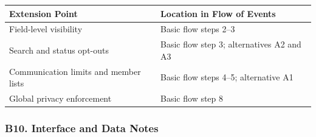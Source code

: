 \documentclass[12pt]{article}
\renewcommand{\baselinestretch}{1.5}
\begin{document}
\begingroup
\small
\renewcommand{\baselinestretch}{1.0}\selectfont
\renewcommand{\arraystretch}{1.15}
\setlength{\tabcolsep}{6pt}
\begin{longtable}{|>{\raggedright\arraybackslash}p{}|>{\raggedright\arraybackslash}p{}|}
\hline
\textbf{Extension Point} & \textbf{Location in Flow of Events} \\ \hline
\endhead
Field-level visibility & Basic flow steps 2--3 \\ \hline
Search and status opt-outs & Basic flow step 3; alternatives A2 and A3 \\ \hline
Communication limits and member lists & Basic flow steps 4--5; alternative A1 \\ \hline
Global privacy enforcement & Basic flow step 8 \\ \hline
\end{longtable}
\endgroup
\par\medskip

\hypertarget{sec:b10-interface-and-data-notes}{}
\subsubsection*{B10. Interface and Data Notes}
\par\medskip
\end{document}
